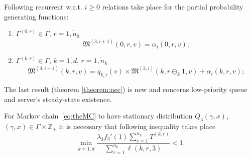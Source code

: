 \documentclass[runningheads,a4paper]{llncs}
\begin{document}
\begin{theorem}
Following recurrent w.r.t. $i
\geqslant 0$ relations take place for the  partial probability generating functions:
\begin{enumerate}
\item $\Gamma^{(0,r)} \in \Gamma$, $r = \overline{1,n_0}$ 
$$
\mathfrak{M}^{(3,i+1)}(0,r,v) = \alpha_i(0,r,v);
$$
\item $\Gamma^{(k,r)} \in \Gamma $, $k =\overline{1,d}$, $r=\overline{1,n_{k}}$
$$
\mathfrak{M}^{(3,i+1)}(k,r,v) = q_{k,r} (v)\times  \mathfrak{M}^{(3,i)}(k,r \ominus_{k} 1,v) + \alpha_i(k,r,v);
$$
\end{enumerate}
\label{theorem:gen}
\end{theorem}


The last result (theorem \ref{theorem:nec}) is new and concerns low-priority queue and server's steady-state existence.
\begin{theorem}
For Markov chain~\eqref{eq:theMC} to have stationary distribution $Q_3(\gamma,x)$, $(\gamma,x)\in \Gamma \times {\mathbb Z}_+$ it is necessary that  following inequality takes place
$$
\min_{k=\overline{1,d}} { \frac{\lambda_3 f_3'(1) \sum_{r = 1}^{n_k} T^{(k,r)}}  {\sum_{r = 1}^{n_{k}}\ell(k,r,3)}} <1.
$$
\label{theorem:nec}
\end{theorem}
\end{document}
